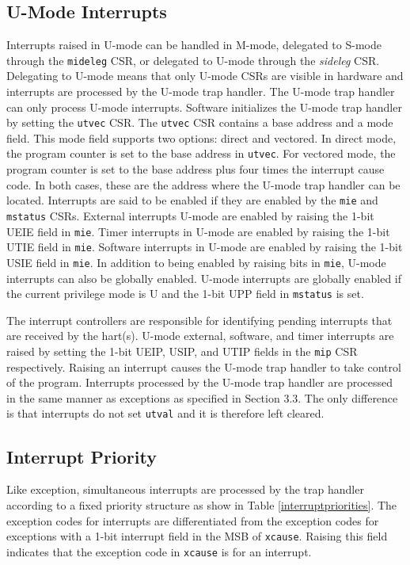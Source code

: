 \documentclass[12pt]{article}
\begin{document}
\subsection{U-Mode Interrupts}
Interrupts raised in U-mode can be handled in M-mode, delegated to S-mode through the {\tt{mideleg}} CSR, or delegated to U-mode through the \emph{sideleg} CSR. Delegating to U-mode means that only U-mode CSRs are visible in hardware and interrupts are processed by the U-mode trap handler. The U-mode trap handler can only process U-mode interrupts. Software initializes the U-mode trap handler by setting the {\tt{utvec}} CSR. The {\tt{utvec}} CSR contains a base address and a mode field. This mode field supports two options: direct and vectored. In direct mode, the program counter is set to the base address in {\tt{utvec}}. For vectored mode, the program counter is set to the base address plus four times the interrupt cause code. In both cases, these are the address where the U-mode trap handler can be located. Interrupts are said to be enabled if they are enabled by the {\tt{mie}} and {\tt{mstatus}} CSRs. External interrupts U-mode are enabled by raising the 1-bit UEIE field in {\tt{mie}}. Timer interrupts in U-mode are enabled by raising the 1-bit UTIE field in {\tt{mie}}. Software interrupts in U-mode are enabled by raising the 1-bit USIE field in {\tt{mie}}. In addition to being enabled by raising bits in {\tt{mie}}, U-mode interrupts can also be globally enabled. U-mode interrupts are globally enabled if the current privilege mode is U and the 1-bit UPP field in {\tt{mstatus}} is set.

The interrupt controllers are responsible for identifying pending interrupts that are received by the hart(s). U-mode external, software, and timer interrupts are raised by setting the 1-bit UEIP, USIP, and UTIP fields in the {\tt{mip}} CSR respectively. Raising an interrupt causes the U-mode trap handler to take control of the program. Interrupts processed by the U-mode trap handler are processed in the same manner as exceptions as specified in Section 3.3. The only difference is that interrupts do not set {\tt{utval}} and it is therefore left cleared.

\subsection{Interrupt Priority}
Like exception, simultaneous interrupts are processed by the trap handler according to a fixed priority structure as show in Table \ref{interruptpriorities}. The exception codes for interrupts are differentiated from the exception codes for exceptions with a 1-bit interrupt field in the MSB of {\tt{xcause}}. Raising this field indicates that the exception code in {\tt{xcause}} is for an interrupt. 
\end{document}
